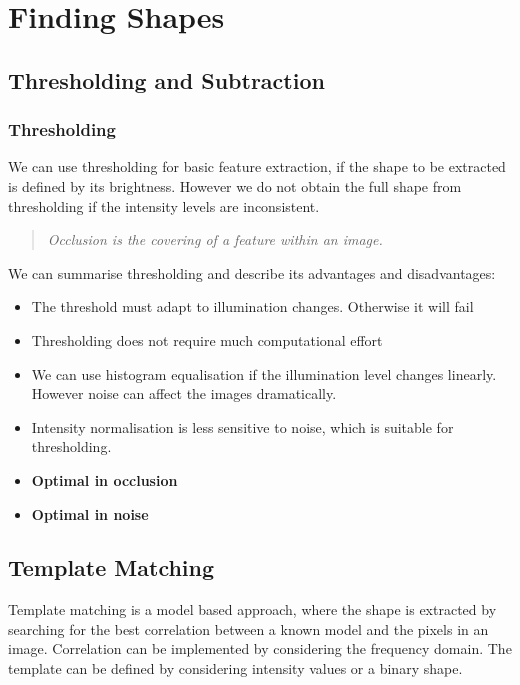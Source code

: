 \section{Finding Shapes}

\subsection{Thresholding and Subtraction}

\subsubsection{Thresholding}
We can use thresholding for basic feature extraction, if the shape to be extracted is defined by its brightness. However we do not obtain the full shape from thresholding if the intensity levels are inconsistent.

\begin{quote}
   \textit{ Occlusion is the covering of a feature within an image.}
\end{quote}

We can summarise thresholding and describe its advantages and disadvantages:

\begin{itemize}
    \itemsep0em
    \item The threshold must adapt to illumination changes. Otherwise it will fail
    \item Thresholding does not require much computational effort
    \item We can use histogram equalisation if the illumination level changes linearly. However noise can affect the images dramatically.
    \item Intensity normalisation is less sensitive to noise, which is suitable for thresholding.
    \item \textbf{Optimal in occlusion}
    \item \textbf{Optimal in noise}
\end{itemize}


\subsection{Template Matching}
Template matching is a model based approach, where the shape is extracted by searching for the best correlation between a known model and the pixels in an image. Correlation can be implemented by considering the frequency domain. The template can be defined by considering intensity values or a binary shape. \\

